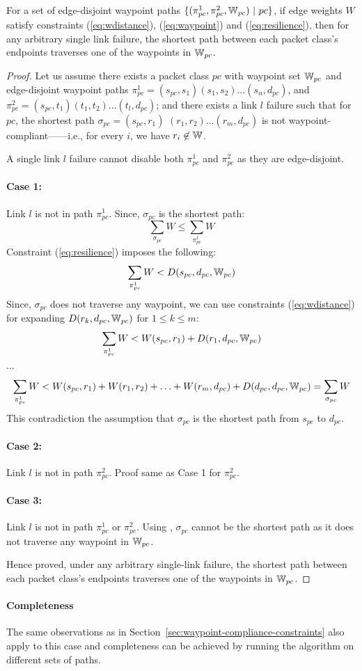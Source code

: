 \begin{theorem}[Soundness]
	For a set of edge-disjoint waypoint paths $\{(\pi^1_{pc}, \pi^2_{pc}, \mathbb{W}_{pc}) ~|~ pc\}$, 
	if edge weights $W$ satisfy constraints (\ref{eq:wdistance}), (\ref{eq:waypoint}) and
	(\ref{eq:resilience}), 
	then for any arbitrary single link failure, 
	the shortest path between each packet class's 
	endpoints traverses one of the waypoints in $\mathbb{W}_{pc}$.
\end{theorem}
\begin{proof}
	Let us assume there exists a packet class $pc$ with waypoint set $\mathbb{W}_{pc}$ 
	and edge-disjoint waypoint paths $\pi^1_{pc} = (s_{pc}, s_1)(s_1, s_2)\ldots (s_n, d_{pc})$, 
	and $\pi^2_{pc} = (s_{pc}, t_1)(t_1, t_2)\ldots (t_l, d_{pc})$; and there exists 
	a link $l$ failure 
	such that for $pc$, the 
	shortest path $\sigma_{pc}=(s_{pc}, r_1)$ $(r_1, r_2)\ldots (r_m, d_{pc})$ 
	is not waypoint-compliant------i.e.,  
	for every $i$, we have $r_i\not\in \mathbb{W}$.
	
	A single link $l$ failure cannot disable both $\pi_{pc}^1$ and $\pi_{pc}^2$ as they are 
	edge-disjoint. 
	\paragraph{Case 1:} Link $l$ is not in path $\pi_{pc}^1$. Since, $\sigma_{pc}$ is 
	the shortest path: 
	\[
	\sum_{\sigma_{pc}}W \leq \sum_{\pi_{pc}^1}W
	\]
	Constraint (\ref{eq:resilience}) imposes the following: 
	\[
	\sum_{\pi_{pc}^1}W < D(s_{pc}, d_{pc}, \mathbb{W}_{pc}) 
	\]
	Since, $\sigma_{pc}$ does not traverse any waypoint, we can use 
	constraints (\ref{eq:wdistance}) for expanding $D(r_k, d_{pc}, \mathbb{W}_{pc})$ 
	for $1 \leq k \leq m$: 
	\[
	\sum_{\pi_{pc}^1}W < W(s_{pc}, r_1) + D(r_1, d_{pc}, \mathbb{W}_{pc}) 
	\]
	\begin{center}
	$\ldots$
	\end{center}
	\[
	\sum_{\pi_{pc}^1}W < W(s_{pc}, r_1) + W(r_1, r_2) + \ldots + W(r_m, d_{pc}) + D(d_{pc}, d_{pc}, \mathbb{W}_{pc}) = \sum_{\sigma_{pc}}W
	\]
	This contradiction the assumption that $\sigma_{pc}$ is the shortest path from $s_{pc}$ to $d_{pc}$.

	\paragraph{Case 2:} Link $l$ is not in path $\pi_{pc}^2$. Proof same as Case 1 for $\pi_{pc}^2$. 
	\paragraph{Case 3:} Link $l$ is not in path $\pi_{pc}^1$ or $\pi_{pc}^2$. Using , 
	$\sigma_{pc}$ cannot be the shortest path as it does not traverse any waypoint in $\mathbb{W}_{pc}$. 
	
	Hence proved, under any arbitrary single-link failure, the shortest path between each packet class's 
	endpoints traverses one of the waypoints in $\mathbb{W}_{pc}$.
\end{proof}

\paragraph{Completeness}
The same observations as in Section~\ref{sec:waypoint-compliance-constraints}
also apply to this case and completeness can be achieved by running the algorithm
on different sets of paths.
